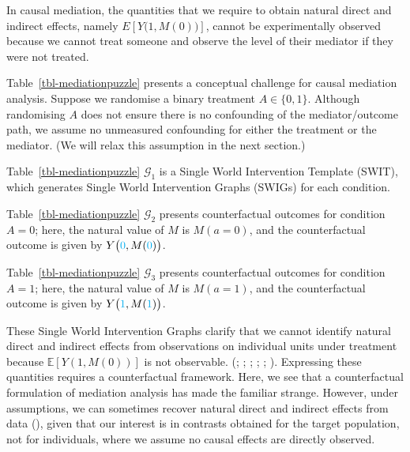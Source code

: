 \documentclass[
  single column]{article}
\begin{document}
\begin{table}

\caption{\label{tbl-mediationpuzzle}In causal mediation, the quantities
that we require to obtain natural direct and indirect effects, namely
\(E[Y\big(1,M(0)\big)]\), cannot be experimentally observed because we
cannot treat someone and observe the level of their mediator if they
were not treated.}

\centering{

\mediationpuzzle

}

\end{table}%

Table~\ref{tbl-mediationpuzzle} presents a conceptual challenge for
causal mediation analysis. Suppose we randomise a binary treatment
\(A \in \{0,1\}\). Although randomising \(A\) does not ensure there is
no confounding of the mediator/outcome path, we assume no unmeasured
confounding for either the treatment or the mediator. (We will relax
this assumption in the next section.)

Table~\ref{tbl-mediationpuzzle} \(\mathcal{G}_1\) is a Single World
Intervention Template (SWIT), which generates Single World Intervention
Graphs (SWIGs) for each condition.

Table~\ref{tbl-mediationpuzzle} \(\mathcal{G}_2\) presents
counterfactual outcomes for condition \(A = 0\); here, the natural value
of \(M\) is \(M(a = 0)\), and the counterfactual outcome is given by
\(Y\big(\textcolor{cyan}{0}, M(\textcolor{cyan}{0})\big)\).

Table~\ref{tbl-mediationpuzzle} \(\mathcal{G}_3\) presents
counterfactual outcomes for condition \(A = 1\); here, the natural value
of \(M\) is \(M(a = 1)\), and the counterfactual outcome is given by
\(Y\big(\textcolor{cyan}{1}, M(\textcolor{cyan}{1})\big)\).

These Single World Intervention Graphs clarify that we cannot identify
natural direct and indirect effects from observations on individual
units under treatment because \(\mathbb{E}[Y(1, M(0))]\) is not
observable. (;
;
;
;
;
).
Expressing these quantities requires a counterfactual framework. Here,
we see that a counterfactual formulation of mediation analysis has made
the familiar strange. However, under assumptions, we can sometimes
recover natural direct and indirect effects from data
(), given that our
interest is in contrasts obtained for the target population, not for
individuals, where we assume no causal effects are directly observed.
\end{document}
